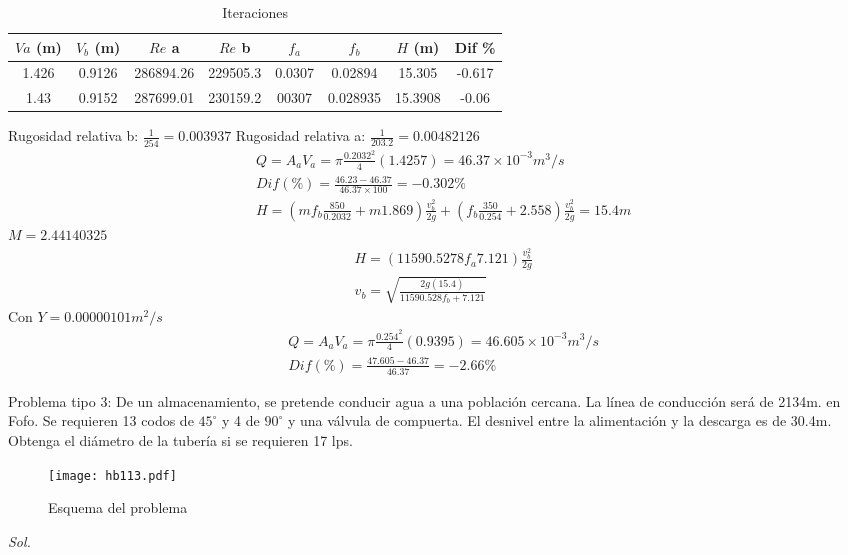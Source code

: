 \begin{table}[h!]
    \centering
    \begin{tabular}{@{}cccccccc@{}}
    \toprule
    $Va$ (m) & $V_b$ (m) & $Re$ a    & $Re$ b   & $f_a$  & $f_b$    & $H$ (m) & Dif \% \\ \midrule
    1.426    & 0.9126    & 286894.26 & 229505.3 & 0.0307 & 0.02894  & 15.305  & -0.617 \\
    1.43     & 0.9152    & 287699.01 & 230159.2 & 00307  & 0.028935 & 15.3908 & -0.06  \\ \bottomrule
    \end{tabular}
    \caption{Iteraciones}
    \label{tabhb29}
\end{table}
Rugosidad relativa b: $\frac{1}{254}=0.003937$
Rugosidad relativa a: $\frac{1}{203.2}=0.00482126$
\begin{align*}
    &Q = A_a V_a = \pi\frac{0.2032^2}{4}(1.4257) = 46.37 \times 10^{ -3}m^3/s\\
    &Dif(\%) =\frac{46.23 -46.37}{46.37 \times 100} =-0.302\%\\
    &H =\left(mf_b\frac{850}{0.2032} + m1.869\right) \frac{v_b^2}{2g} +\left(f_b\frac{350}{0.254} + 2.558\right) \frac{v_b^2}{2g} =15.4m
\end{align*}
$M=2.44140325$
\begin{align*}
    &H =\left(11590.5278 f_a 7.121\right)\frac{v_b^2}{2g}\\
    &v_b = \sqrt{\frac{2g(15.4)}{11590.528f_b + 7.121}}
\end{align*}
Con $Y=0.00000101 m^2/s$
\begin{align*}
    &Q = A_a V_a = \pi\frac{0.254^2}{4}(0.9395) = 46.605 \times 10^{ -3}m^3/s\\
    &Dif(\%) =\frac{47.605 -46.37}{46.37} =-2.66\%
\end{align*}
\begin{example}
    Problema tipo 3: De un almacenamiento, se pretende conducir agua a una población cercana. La línea de conducción será de 2134m. en Fofo. Se requieren 13 codos de $45^{\circ}$ y 4 de $90^{\circ}$ y una válvula de compuerta. El desnivel entre la alimentación y la descarga es de 30.4m. Obtenga el diámetro de la tubería si se requieren 17 lps.
\end{example}
\begin{figure}[h!]
\centering
  \texttt{[image: hb113.pdf]}
  \caption{Esquema del problema}
  \label{hb113}
\end{figure}
\textit{ Sol. }

